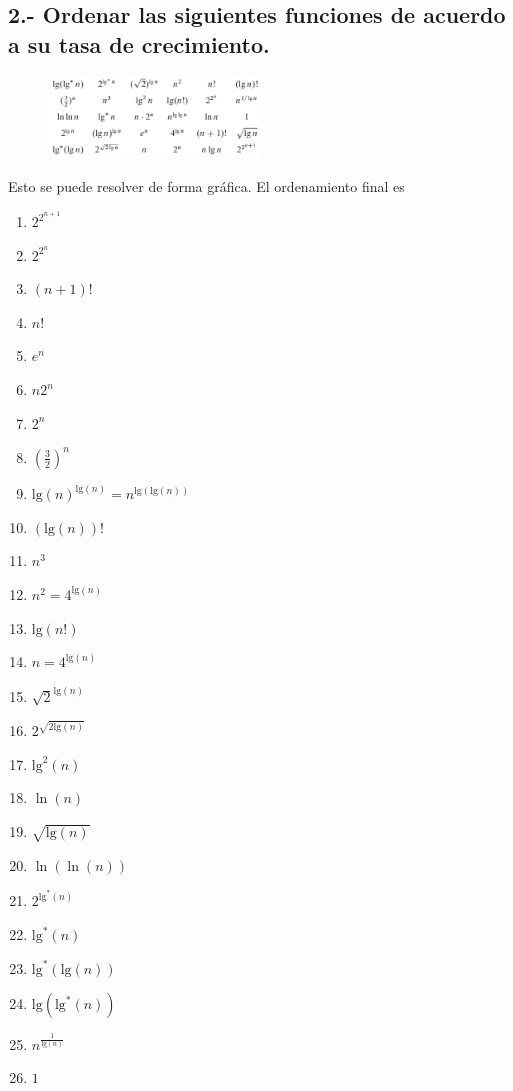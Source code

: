 \documentclass{article}
\begin{document}

\subsection*{2.- Ordenar las siguientes funciones de acuerdo a su tasa de crecimiento.}

\begin{figure}[H]
\centering
\includegraphics[width=0.5\textwidth]{img/ecuaciones_preg2.png}
\end{figure}

Esto se puede resolver de forma gráfica. El ordenamiento final es

\begin{enumerate}
\def\labelenumi{\arabic{enumi}.}
\itemsep1pt\parskip0pt
\item
  $2^{2^{n+1}}$
\item
  $2^{2^{n}}$
\item
  $(n+1)!$
\item
  $n!$
\item $e^n$
\item $n 2^n$
\item $2^n$
\item $(\frac{3}{2})^n$
\item $\textrm{lg}(n)^{\textrm{lg}(n)} = n^{\textrm{lg}( \textrm{lg}(n))}$ 
\item $(\textrm{lg}(n))!$
\item $n^3$
\item $n^2 = 4^{\textrm{lg}(n)}$ 
\item $\textrm{lg}(n!)$
\item $n = 4^{\textrm{lg}(n)}$
\item $\sqrt{2}^{\textrm{lg}(n)}$
\item $2^{\sqrt{2 \textrm{lg}(n)}}$
\item $\textrm{lg}^2(n)$
\item $\ln (n)$
\item $\sqrt{\textrm{lg}(n)}$
\item $\ln(\ln(n))$
\item $2^{\textrm{lg}^*(n)}$
\item $\textrm{lg}^*(n)$
\item $\textrm{lg}^*(\textrm{lg}(n))$
\item $\textrm{lg}(\textrm{lg}^*(n))$
\item $n^{\frac{1}{\textrm{lg}(n)}}$
\item $1$
\end{enumerate}
\end{document}
